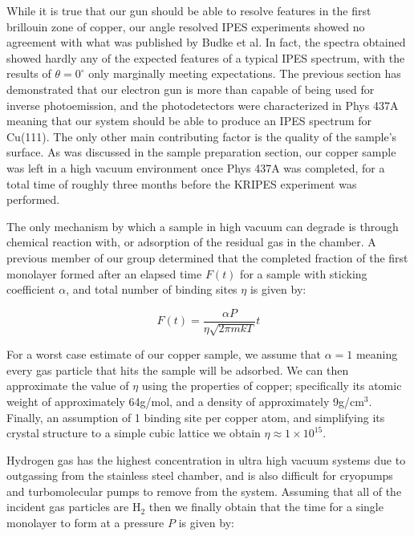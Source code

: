 While it is true that our gun should be able to resolve features in the first brillouin zone of copper, our angle resolved IPES experiments showed 
no agreement with what was published by Budke et al. In fact, the spectra obtained showed hardly any of the expected features of a typical IPES 
spectrum, with the results of $\theta=0^\circ$ only marginally meeting expectations. The previous section has demonstrated that our electron gun 
is more than capable of being used for inverse photoemission, and the photodetectors were characterized in Phys 437A meaning that our system should 
be able to produce an IPES spectrum for Cu(111). The only other main contributing factor is the quality of the sample's surface. As was discussed in 
the sample preparation section, our copper sample was left in a high vacuum environment once Phys 437A was completed, for a total time of roughly 
three months before the KRIPES experiment was performed.

The only mechanism by which a sample in high vacuum can degrade is through chemical reaction with, or adsorption of the residual gas in the chamber.
A previous member of our group\cite{mcmahon_2012,lafferty_1998} determined that the completed fraction of the first monolayer formed after an elapsed time $F(t)$
for a sample with sticking coefficient $\alpha$, and total number of binding sites $\eta$ is given by:

\begin{equation}
    F(t) = \frac{\alpha P}{\eta \sqrt{2\pi m kT}}t
\end{equation}

For a worst case estimate of our copper sample, we assume that $\alpha=1$ meaning every gas particle that hits the sample will be adsorbed. We can 
then approximate the value of $\eta$ using the properties of copper\cite{mcmahon_2012}; specifically its atomic weight of approximately 64g/mol, 
and a density of approximately 9g/cm$^3$. Finally, an assumption of 1 binding site per copper atom, and simplifying its crystal structure to a 
simple cubic lattice we obtain $\eta\approx1\times10^{15}$. 

Hydrogen gas has the highest concentration in ultra high vacuum systems due to outgassing from the stainless steel chamber\cite{article}, and is also
difficult for cryopumps and turbomolecular pumps to remove from the system\cite{danielson}. Assuming that all of the incident gas particles 
are H$_2$ then we finally obtain that the time for a single monolayer to form at a pressure $P$ is given by:

